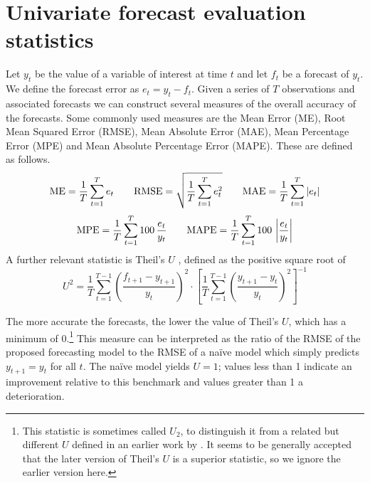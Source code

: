 \section{Univariate forecast evaluation statistics}
\label{sec:fcast-stats}

Let $y_t$ be the value of a variable of interest at time $t$ and let
$f_t$ be a forecast of $y_t$.  We define the forecast error as
$e_t = y_t - f_t$.  Given a series of $T$ observations and associated
forecasts we can construct several measures of the overall accuracy of
the forecasts.  Some commonly used measures are the Mean Error (ME),
Root Mean Squared Error (RMSE), Mean Absolute Error (MAE), Mean
Percentage Error (MPE) and Mean Absolute Percentage Error (MAPE).
These are defined as follows.
%
\[ {\rm ME} = \frac{1}{T} \sum_{t=1}^T e_t \qquad 
   {\rm RMSE} = \sqrt{\frac{1}{T} \sum_{t=1}^T e_t^2} \qquad 
   {\rm MAE} = \frac{1}{T} \sum_{t=1}^T |e_t|
\] 
%
\[ {\rm MPE} = \frac{1}{T} \sum_{t=1}^T 100\, \frac{e_t}{y_t} \qquad
   {\rm MAPE} = \frac{1}{T} \sum_{t=1}^T 100\, \left|\frac{e_t}{y_t}\right| 
\]
%
A further relevant statistic is Theil's $U$ \citep{theil66}, defined as
the positive square root of
%
\[ 
U^2 = \frac{1}{T}
     \sum_{t=1}^{T-1} \left(\frac{f_{t+1} - y_{t+1}}{y_t}\right)^2
     \cdot \left[
     \frac{1}{T} \sum_{t=1}^{T-1} 
        \left(\frac{y_{t+1} - y_t}{y_t}\right)^2 \right]^{-1}
\]

The more accurate the forecasts, the lower the value of Theil's $U$,
which has a minimum of 0.\footnote{This statistic is sometimes called
  $U_2$, to distinguish it from a related but different $U$ defined in
  an earlier work by \cite{theil61}.  It seems to be generally accepted
  that the later version of Theil's $U$ is a superior statistic, so we
  ignore the earlier version here.} This measure can be interpreted as
the ratio of the RMSE of the proposed forecasting model to the RMSE of
a na\"ive model which simply predicts $y_{t+1} = y_t$ for all $t$.
The na\"ive model yields $U = 1$; values less than 1 indicate an
improvement relative to this benchmark and values greater than 1 a
deterioration.


